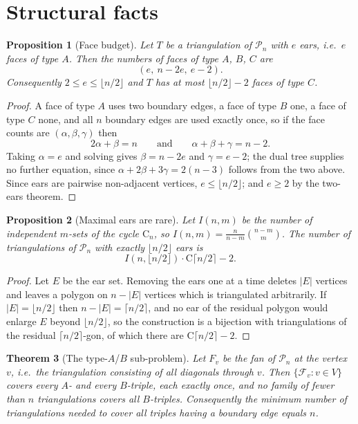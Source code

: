 \documentclass[11pt,a4paper]{article}
\newtheorem{theorem}{Theorem}[section]
\newtheorem{proposition}[theorem]{Proposition}
\theoremstyle{definition}
\newcommand{\Pol}{\mathcal{P}}
\newcommand{\Cat}{\mathrm{C}}
\begin{document}
\section{Structural facts}\label{sec:struct}

\begin{proposition}[Face budget]\label{prop:budget}
Let $T$ be a triangulation of $\Pol_n$ with $e$ ears, i.e.\ $e$ faces of type $A$.
Then the numbers of faces of type $A$, $B$, $C$ are
\[
(e,\ n - 2e,\ e - 2).
\]
Consequently $2 \le e \le \lfloor n/2 \rfloor$ and $T$ has at most
$\lfloor n/2 \rfloor - 2$ faces of type $C$.
\end{proposition}

\begin{proof}
A face of type $A$ uses two boundary edges, a face of type $B$ one, a face of
type $C$ none, and all $n$ boundary edges are used exactly once, so if the face
counts are $(\alpha, \beta, \gamma)$ then
\[
  2\alpha + \beta = n \qquad\text{and}\qquad \alpha + \beta + \gamma = n-2 .
\]
Taking $\alpha = e$ and solving gives $\beta = n - 2e$ and $\gamma = e - 2$; the
dual tree supplies no further equation, since $\alpha + 2\beta + 3\gamma = 2(n-3)$
follows from the two above. Since ears are pairwise non-adjacent vertices,
$e \le \lfloor n/2 \rfloor$; and $e \ge 2$ by the two-ears theorem.
\end{proof}

\begin{proposition}[Maximal ears are rare]\label{prop:maxears}
Let $I(n, m)$ be the number of independent $m$-sets of the cycle $\Cat_n$, so
$I(n, m) = \frac{n}{n-m}\binom{n-m}{m}$. The number of triangulations of $\Pol_n$ with
exactly $\lfloor n/2 \rfloor$ ears is
\[
I\!\left(n, \lfloor n/2 \rfloor\right) \cdot \Cat{\lceil n/2 \rceil - 2}.
\]
\end{proposition}

\begin{proof}
Let $E$ be the ear set. Removing the ears one at a time deletes $|E|$ vertices
and leaves a polygon on $n - |E|$ vertices which is triangulated arbitrarily.
If $|E| = \lfloor n/2 \rfloor$ then $n - |E| = \lceil n/2 \rceil$, and no ear of
the residual polygon would enlarge $E$ beyond $\lfloor n/2 \rfloor$, so the
construction is a bijection with triangulations of the residual
$\lceil n/2 \rceil$-gon, of which there are $\Cat{\lceil n/2 \rceil - 2}$.
\end{proof}

\begin{theorem}[The type-$A$/$B$ sub-problem]\label{thm:fan}
Let $F_v$ be the fan of $\Pol_n$ at the vertex $v$, i.e.\ the triangulation
consisting of all diagonals through $v$. Then $\{\mathcal{F}_v : v \in V\}$ covers
every $A$- and every $B$-triple, each exactly once, and no family of fewer than
$n$ triangulations covers all $B$-triples. Consequently the minimum number of
triangulations needed to cover all triples having a boundary edge equals $n$.
\end{theorem}
\end{document}
